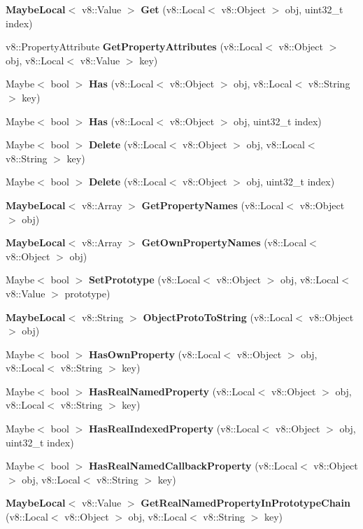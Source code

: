 \begin{DoxyCompactItemize}
\item 
\textbf{ Maybe\+Local}$<$ v8\+::\+Value $>$ \textbf{ Get} (v8\+::\+Local$<$ v8\+::\+Object $>$ obj, uint32\+\_\+t index)
\item 
v8\+::\+Property\+Attribute \textbf{ Get\+Property\+Attributes} (v8\+::\+Local$<$ v8\+::\+Object $>$ obj, v8\+::\+Local$<$ v8\+::\+Value $>$ key)
\item 
Maybe$<$ bool $>$ \textbf{ Has} (v8\+::\+Local$<$ v8\+::\+Object $>$ obj, v8\+::\+Local$<$ v8\+::\+String $>$ key)
\item 
Maybe$<$ bool $>$ \textbf{ Has} (v8\+::\+Local$<$ v8\+::\+Object $>$ obj, uint32\+\_\+t index)
\item 
Maybe$<$ bool $>$ \textbf{ Delete} (v8\+::\+Local$<$ v8\+::\+Object $>$ obj, v8\+::\+Local$<$ v8\+::\+String $>$ key)
\item 
Maybe$<$ bool $>$ \textbf{ Delete} (v8\+::\+Local$<$ v8\+::\+Object $>$ obj, uint32\+\_\+t index)
\item 
\textbf{ Maybe\+Local}$<$ v8\+::\+Array $>$ \textbf{ Get\+Property\+Names} (v8\+::\+Local$<$ v8\+::\+Object $>$ obj)
\item 
\textbf{ Maybe\+Local}$<$ v8\+::\+Array $>$ \textbf{ Get\+Own\+Property\+Names} (v8\+::\+Local$<$ v8\+::\+Object $>$ obj)
\item 
Maybe$<$ bool $>$ \textbf{ Set\+Prototype} (v8\+::\+Local$<$ v8\+::\+Object $>$ obj, v8\+::\+Local$<$ v8\+::\+Value $>$ prototype)
\item 
\textbf{ Maybe\+Local}$<$ v8\+::\+String $>$ \textbf{ Object\+Proto\+To\+String} (v8\+::\+Local$<$ v8\+::\+Object $>$ obj)
\item 
Maybe$<$ bool $>$ \textbf{ Has\+Own\+Property} (v8\+::\+Local$<$ v8\+::\+Object $>$ obj, v8\+::\+Local$<$ v8\+::\+String $>$ key)
\item 
Maybe$<$ bool $>$ \textbf{ Has\+Real\+Named\+Property} (v8\+::\+Local$<$ v8\+::\+Object $>$ obj, v8\+::\+Local$<$ v8\+::\+String $>$ key)
\item 
Maybe$<$ bool $>$ \textbf{ Has\+Real\+Indexed\+Property} (v8\+::\+Local$<$ v8\+::\+Object $>$ obj, uint32\+\_\+t index)
\item 
Maybe$<$ bool $>$ \textbf{ Has\+Real\+Named\+Callback\+Property} (v8\+::\+Local$<$ v8\+::\+Object $>$ obj, v8\+::\+Local$<$ v8\+::\+String $>$ key)
\item 
\textbf{ Maybe\+Local}$<$ v8\+::\+Value $>$ \textbf{ Get\+Real\+Named\+Property\+In\+Prototype\+Chain} (v8\+::\+Local$<$ v8\+::\+Object $>$ obj, v8\+::\+Local$<$ v8\+::\+String $>$ key)

\end{DoxyCompactItemize}
